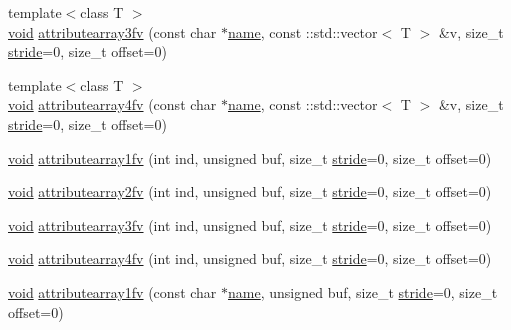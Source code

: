\begin{DoxyCompactItemize}
\item 
{\footnotesize template$<$class T $>$ }\\\hyperlink{namespacetrimesh_a784ddfd979e1c579bda795a8edfc3f43}{void} \hyperlink{classtrimesh_1_1GLManager_aade059bb469973ea84015ed8e3a333f7}{attributearray3fv} (const char $\ast$\hyperlink{namespacetrimesh_a7f24cdcfa73387d7fa6aa44676238a79}{name}, const \+::std\+::vector$<$ T $>$ \&v, size\+\_\+t \hyperlink{namespacetrimesh_adbcc86014e77656be1a9df7ecaae5f2f}{stride}=0, size\+\_\+t offset=0)
\item 
{\footnotesize template$<$class T $>$ }\\\hyperlink{namespacetrimesh_a784ddfd979e1c579bda795a8edfc3f43}{void} \hyperlink{classtrimesh_1_1GLManager_acc0e500a08ca51a6cd129be1ae9222d0}{attributearray4fv} (const char $\ast$\hyperlink{namespacetrimesh_a7f24cdcfa73387d7fa6aa44676238a79}{name}, const \+::std\+::vector$<$ T $>$ \&v, size\+\_\+t \hyperlink{namespacetrimesh_adbcc86014e77656be1a9df7ecaae5f2f}{stride}=0, size\+\_\+t offset=0)
\item 
\hyperlink{namespacetrimesh_a784ddfd979e1c579bda795a8edfc3f43}{void} \hyperlink{classtrimesh_1_1GLManager_a533f0293175df65f99d72a3643f4cb35}{attributearray1fv} (int ind, unsigned buf, size\+\_\+t \hyperlink{namespacetrimesh_adbcc86014e77656be1a9df7ecaae5f2f}{stride}=0, size\+\_\+t offset=0)
\item 
\hyperlink{namespacetrimesh_a784ddfd979e1c579bda795a8edfc3f43}{void} \hyperlink{classtrimesh_1_1GLManager_aaa548adb6d61e8b89baf862adf8f0372}{attributearray2fv} (int ind, unsigned buf, size\+\_\+t \hyperlink{namespacetrimesh_adbcc86014e77656be1a9df7ecaae5f2f}{stride}=0, size\+\_\+t offset=0)
\item 
\hyperlink{namespacetrimesh_a784ddfd979e1c579bda795a8edfc3f43}{void} \hyperlink{classtrimesh_1_1GLManager_ac571bfe4467cffb8f18529207db7ffc6}{attributearray3fv} (int ind, unsigned buf, size\+\_\+t \hyperlink{namespacetrimesh_adbcc86014e77656be1a9df7ecaae5f2f}{stride}=0, size\+\_\+t offset=0)
\item 
\hyperlink{namespacetrimesh_a784ddfd979e1c579bda795a8edfc3f43}{void} \hyperlink{classtrimesh_1_1GLManager_a56b73d1848ed6f24f3f3cf7e6d7c84ee}{attributearray4fv} (int ind, unsigned buf, size\+\_\+t \hyperlink{namespacetrimesh_adbcc86014e77656be1a9df7ecaae5f2f}{stride}=0, size\+\_\+t offset=0)
\item 
\hyperlink{namespacetrimesh_a784ddfd979e1c579bda795a8edfc3f43}{void} \hyperlink{classtrimesh_1_1GLManager_a0ed60b070a8243fc861f77d25ec0bfb3}{attributearray1fv} (const char $\ast$\hyperlink{namespacetrimesh_a7f24cdcfa73387d7fa6aa44676238a79}{name}, unsigned buf, size\+\_\+t \hyperlink{namespacetrimesh_adbcc86014e77656be1a9df7ecaae5f2f}{stride}=0, size\+\_\+t offset=0)

\end{DoxyCompactItemize}
